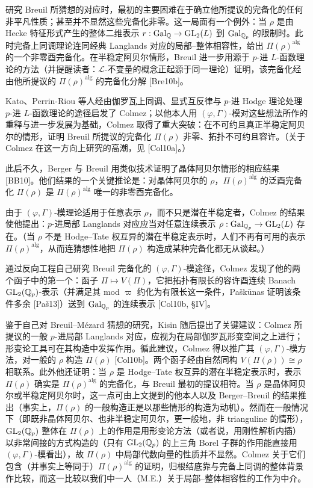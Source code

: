 研究 Breuil 所猜想的对应时，最初的主要困难在于确立他所提议的完备化的任何非平凡性质；甚至并不显然这些完备化非零。这一局面有一个例外：当 $\rho$ 是由 Hecke 特征形式产生的整体二维表示 $r:\mathrm{Gal}_{\mathbb{Q}}\to\mathrm{GL}_2(L)$ 到 $\mathrm{Gal}_{\mathbb{Q}_p}$ 的限制时。此时完备上同调理论连同经典 Langlands 对应的局部--整体相容性，给出 $\Pi(\rho)^{\mathrm{alg}}$ 的一个非零酉完备化。在半稳定阿贝尔情形，Breuil 进一步用源于 $p$-进 $L$-函数理论的方法（并提醒读者：$\mathcal{L}$-不变量的概念正起源于同一理论）证明，该完备化经由他所提议的 $\Pi(\rho)^{\mathrm{alg}}$ 的完备化分解 [Bre10b]。

Kato、Perrin-Riou 等人经由伽罗瓦上同调、显式互反律与 $p$-进 Hodge 理论处理 $p$-进 $L$-函数理论的途径启发了 Colmez；以他本人用 $(\varphi,\Gamma)$-模对这些想法所作的重释与进一步发展为基础，Colmez 取得了重大突破：在不可约且真正半稳定阿贝尔的情形，证明 Breuil 所提议的完备化 $\Pi(\rho)$ 非零、拓扑不可约且容许。（关于 Colmez 在这一方向上研究的高潮，见 [Col10a]。）

此后不久，Berger 与 Breuil 用类似技术证明了晶体阿贝尔情形的相应结果 [BB10]。他们结果的一个关键推论是：对晶体阿贝尔的 $\rho$，$\Pi(\rho)^{\mathrm{alg}}$ 的泛酉完备化 $\Pi(\rho)$ 是 $\Pi(\rho)^{\mathrm{alg}}$ 唯一的非零酉完备化。

由于 $(\varphi,\Gamma)$-模理论适用于任意表示 $\rho$，而不只是潜在半稳定者，Colmez 的结果使他提出：$p$-进局部 Langlands 对应应当对任意连续表示 $\rho:\mathrm{Gal}_{\mathbb{Q}_p}\to\mathrm{GL}_2(L)$ 存在。（当 $\rho$ 不是 Hodge--Tate 权互异的潜在半稳定表示时，人们不再有可用的表示 $\Pi(\rho)^{\mathrm{alg}}$，从而连猜想性地把 $\Pi(\rho)$ 构造成某种完备化都无从谈起。）

通过反向工程自己研究 Breuil 完备化的 $(\varphi,\Gamma)$-模途径，Colmez 发现了他的两个函子中的第一个：函子 $\Pi\mapsto V(\Pi)$，它把拓扑有限长的容许酉连续 Banach $\mathrm{GL}_2(\mathbb{Q}_p)$-表示（并满足其 mod $\varpi$ 约化为有限长这一条件，Paškūnas 证明该条件多余 [Paš13]）送到 $\mathrm{Gal}_{\mathbb{Q}_p}$ 的连续表示 [Col10b, §IV]。

鉴于自己对 Breuil--Mézard 猜想的研究，Kisin 随后提出了关键建议：Colmez 所提议的一般 $p$-进局部 Langlands 对应，应视为在局部伽罗瓦形变空间之上进行；形变论工具可在其构造中发挥作用。循此建议，Colmez 得以推广其 $(\varphi,\Gamma)$-模方法，对一般的 $\rho$ 构造 $\Pi(\rho)$ [Col10b]。两个函子经由自然同构 $V(\Pi(\rho))\cong\rho$ 相联系。此外他还证明：当 $\rho$ 是 Hodge--Tate 权互异的潜在半稳定表示时，表示 $\Pi(\rho)$ 确实是 $\Pi(\rho)^{\mathrm{alg}}$ 的完备化，与 Breuil 最初的提议相符。当 $\rho$ 是晶体阿贝尔或半稳定阿贝尔时，这一点可由上文提到的他本人以及 Berger--Breuil 的结果推出（事实上，$\Pi(\rho)$ 的一般构造正是以那些情形的构造为动机）。然而在一般情况下（即既非晶体阿贝尔、也非半稳定阿贝尔，更一般地，非 trianguline 的情形），$\mathrm{GL}_2(\mathbb{Q}_p)$ 整体在 $\Pi(\rho)$ 上的作用是用形变论方法（或者说，用刚性解析内插）以非常间接的方式构造的（只有 $\mathrm{GL}_2(\mathbb{Q}_p)$ 的上三角 Borel 子群的作用能直接用 $(\varphi,\Gamma)$-模看出），故 $\Pi(\rho)$ 中局部代数向量的性质并不显然。Colmez 关于它们包含（并事实上等同于）$\Pi(\rho)^{\mathrm{alg}}$ 的证明，归根结底靠与完备上同调的整体背景作比较，而这一比较以我们中一人（M.E.）关于局部--整体相容性的工作为中介。

